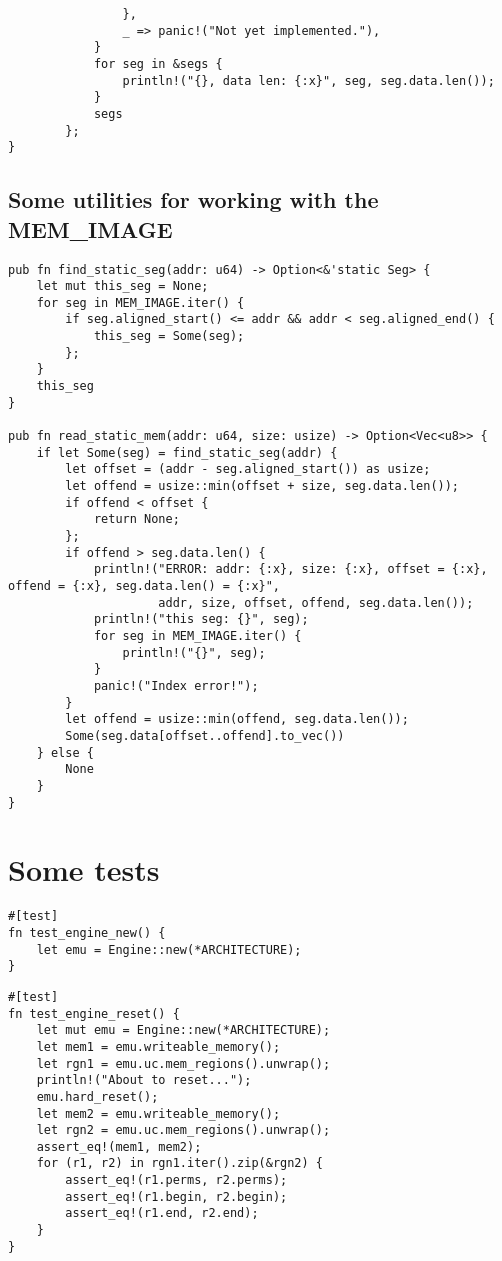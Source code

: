 \documentclass[11pt]{article}
\begin{document}
\begin{lstlisting}
                },
                _ => panic!("Not yet implemented."),
            }
            for seg in &segs {
                println!("{}, data len: {:x}", seg, seg.data.len());
            }
            segs
        };
}
\end{lstlisting}

\subsection{Some utilities for working with the MEM\_IMAGE}
\label{sec:org49fc065}

\lstset{language=rust,label=orgb6de8b9,caption= ,captionpos=b,numbers=none}
\begin{lstlisting}
pub fn find_static_seg(addr: u64) -> Option<&'static Seg> {
    let mut this_seg = None;
    for seg in MEM_IMAGE.iter() {
        if seg.aligned_start() <= addr && addr < seg.aligned_end() {
            this_seg = Some(seg);
        };
    }
    this_seg
}

pub fn read_static_mem(addr: u64, size: usize) -> Option<Vec<u8>> {
    if let Some(seg) = find_static_seg(addr) {
        let offset = (addr - seg.aligned_start()) as usize;
        let offend = usize::min(offset + size, seg.data.len());
        if offend < offset {
            return None;
        };
        if offend > seg.data.len() {
            println!("ERROR: addr: {:x}, size: {:x}, offset = {:x}, offend = {:x}, seg.data.len() = {:x}",
                     addr, size, offset, offend, seg.data.len());
            println!("this seg: {}", seg);
            for seg in MEM_IMAGE.iter() {
                println!("{}", seg);
            }
            panic!("Index error!");
        }
        let offend = usize::min(offend, seg.data.len());
        Some(seg.data[offset..offend].to_vec())
    } else {
        None
    }
}
\end{lstlisting}

\section{Some tests}
\label{sec:org16f968b}
\lstset{language=rust,label=org640123e,caption= ,captionpos=b,numbers=none}
\begin{lstlisting}
#[test]
fn test_engine_new() {
    let emu = Engine::new(*ARCHITECTURE);
}
\end{lstlisting}


\lstset{language=rust,label=org03a92f3,caption= ,captionpos=b,numbers=none}
\begin{lstlisting}
#[test]
fn test_engine_reset() {
    let mut emu = Engine::new(*ARCHITECTURE);
    let mem1 = emu.writeable_memory();
    let rgn1 = emu.uc.mem_regions().unwrap();
    println!("About to reset...");
    emu.hard_reset();
    let mem2 = emu.writeable_memory();
    let rgn2 = emu.uc.mem_regions().unwrap();
    assert_eq!(mem1, mem2);
    for (r1, r2) in rgn1.iter().zip(&rgn2) {
        assert_eq!(r1.perms, r2.perms);
        assert_eq!(r1.begin, r2.begin);
        assert_eq!(r1.end, r2.end);
    }
}
\end{lstlisting}
\end{document}
